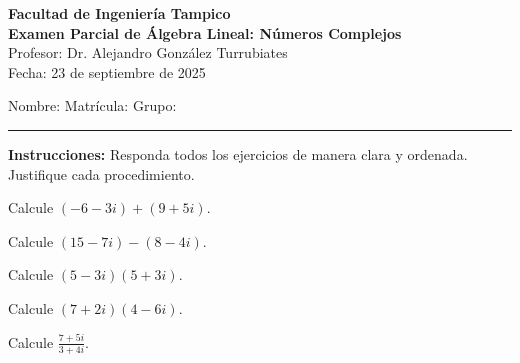\documentclass[12pt]{article}
\begin{document}
\begin{center}
    \large \textbf{Facultad de Ingeniería Tampico}\\[6pt]
    \normalsize \textbf{Examen Parcial de Álgebra Lineal: Números Complejos}\\%
    \normalsize Profesor: Dr. Alejandro González Turrubiates \\%
    \normalsize Fecha: 23 de septiembre de 2025
\end{center}

\noindent
Nombre: \underline{\hspace{8cm}} Matrícula: \underline{\hspace{3cm}} Grupo: \underline{\hspace{1cm}}
\vspace{0.5cm}

\hrule
\vspace{0.5cm}

\noindent
\textbf{Instrucciones:} Responda todos los ejercicios de manera clara y ordenada. Justifique cada procedimiento.

\vspace{0.5cm}


\begin{ejercicio}
Calcule $(-6-3i) + (9+5i)$.
\end{ejercicio}

\vspace{1cm}

\begin{ejercicio}
Calcule $(15-7i) - (8-4i)$.
\end{ejercicio}

\vspace{1cm}

\begin{ejercicio}
Calcule $(5-3i)(5+3i)$.
\end{ejercicio}

\vspace{1cm}

\begin{ejercicio}
Calcule $(7+2i)(4-6i)$.
\end{ejercicio}

\vspace{2cm}

\begin{ejercicio}
Calcule $\displaystyle \frac{7+5i}{3+4i}$.
\end{ejercicio}
\end{document}
